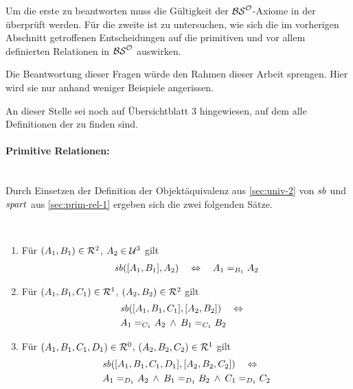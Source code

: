     Um die erste %
    zu beantworten muss die Gültigkeit der $\mathcal{BS}^{\mathcal{O}}$-Axiome in der \strukt überprüft werden.
    Für die zweite ist zu untersuchen, wie sich die im vorherigen Abschnitt getroffenen Entscheidungen auf die primitiven und vor allem definierten Relationen in $\mathcal{BS}^{\mathcal{O}}$ auswirken.

    Die Beantwortung dieser Fragen würde den Rahmen dieser Arbeit sprengen. 
    Hier wird sie nur anhand weniger Beispiele angerissen.
    
    An dieser Stelle sei noch auf Übersichtblatt 3 hingewiesen, auf dem alle Definitionen der \strukt zu finden sind.
    


    \paragraph{Primitive Relationen:}\ \\
    Durch Einsetzen der Definition der Objektäquivalenz aus \ref{sec:univ-2} von $\mathit{sb}$ und $\mathit{spart}$ aus \ref{sec:prim-rel-1} ergeben sich die zwei folgenden Sätze.

    \begin{satz}\ \vspace{0pt}

        \begin{enumerate}
            \item Für $(A_1,B_1) \in \mathcal{R}^2$, $A_2 \in \mathcal{U}^3$ gilt 
                \begin{align*}
                    \mathit{sb}([A_1,B_1],A_2) 
                    \quad \Leftrightarrow \quad 
                    A_1 =_{B_1} A_2
                \end{align*}
            \item Für $(A_1,B_1,C_1) \in \mathcal{R}^1$, $(A_2,B_2) \in \mathcal{R}^2$ gilt 
                \begin{align*}
                    &\mathit{sb}([A_1,B_1,C_1],[A_2,B_2]) 
                    \quad \Leftrightarrow \quad\\
                    &A_1 =_{C_1} A_2 \:\land\: B_1 =_{C_1} B_2
                \end{align*}
            \item Für $(A_1,B_1,C_1,D_1) \in \mathcal{R}^0$, $(A_2,B_2,C_2) \in \mathcal{R}^1$ gilt 
                \begin{align*}
                    &\mathit{sb}([A_1,B_1,C_1,D_1],[A_2,B_2,C_2]) 
                    \quad \Leftrightarrow \quad\\ 
                    &A_1 =_{D_1} A_2 \:\land\: B_1 =_{D_1} B_2 \:\land\: C_1 =_{D_1} C_2
                \end{align*}
        \end{enumerate}
        
    \end{satz}
    
